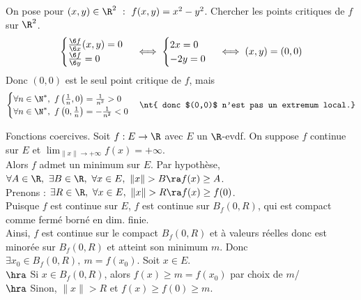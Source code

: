 \documentclass[11pt]{article}
\begin{document}
\vspace*{-0.8cm}

\begin{ex}{}{}
    On pose pour $(x,y)\in\R^2 ~:~ f(x,y)=x^2-y^2$. Chercher les points critiques de $f$ sur $\R^2$.
    \tcblower
    \vspace*{-0.3cm}
    \begin{equation*}
        \begin{cases}\frac{\6 f}{\6 x}(x,y) = 0  \\ \frac{\6 f}{\6 y} = 0 \end{cases} \iff \begin{cases}
            2x = 0 \\ -2y = 0 
        \end{cases} \iff (x,y) = (0,0)
    \end{equation*}
    Donc $(0,0)$ est le seul point critique de $f$, mais
    \begin{equation*}
        \begin{cases}
            \forall n \in \N^*, ~ f\left( \frac{1}{n}, 0 \right) = \frac{1}{n^2} > 0 \\ \forall n \in \N^*, ~ f\left( 0, \frac{1}{n} \right) = -\frac{1}{n^2} < 0 
        \end{cases} \nt{ donc $(0,0)$ n'est pas un extremum local.}
    \end{equation*}
\end{ex}

\begin{prop}{Fonctions coercives.}{}
    Soit $f:E\to\R$ avec $E$ un $\R$-evdf. On suppose $f$ continue sur $E$ et $\lim_{\|x\|\to+\infty}f(x)=+\infty$.\\
    Alors $f$ admet un minimum sur $E$.
    \tcblower
    Par hypothèse, $\forall A \in \R, ~ \exists B \in \R, ~ \forall x \in E, ~ \|x\|>  B \ra f(x)\geq A$.\\
    Prenons  : $\exists R \in \R, ~ \forall x \in E, ~ \|x\|> R\ra f(x)\geq f(0)$.\\
    Puisque $f$ est continue sur $E$, $f$ est continue sur $B_f(0,R)$, qui est compact comme fermé borné en dim. finie.\\
    Ainsi, $f$ est continue sur le compact $B_f(0,R)$ et à valeurs réelles donc est minorée sur $B_f(0,R)$ et atteint son minimum $m$. Donc $\exists x_0 \in B_f(0,R), ~ m = f(x_0)$. Soit $x\in E$.\\
    $\hra$ Si $x\in B_f(0,R)$, alors $f(x) \geq m = f(x_0)$ par choix de $m$/\\
    $\hra$ Sinon, $\|x\|>R$ et $f(x)\geq f(0)\geq m$.
\end{prop}
\end{document}
